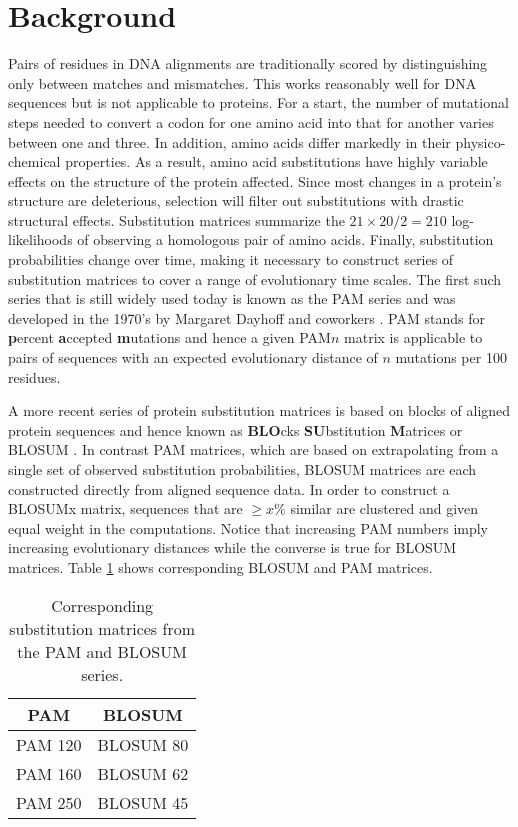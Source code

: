 \section{Background}
Pairs of residues in DNA alignments are traditionally scored by
distinguishing only between matches and mismatches. This works
reasonably well for DNA sequences but is not applicable to
proteins. For a start, the number of mutational steps needed to
convert a codon for one amino acid into that for another varies
between one and three. In addition, amino acids differ markedly in their
physico-chemical properties. As a result, amino acid substitutions
have highly variable effects on the structure of the protein
affected. Since most changes in a protein's structure are deleterious,
selection will filter out 
substitutions with drastic structural effects. Substitution matrices
summarize the $21\times20/2 = 210$
log-likelihoods of observing a homologous pair of amino acids. 
Finally, substitution probabilities change over time,
making it necessary to construct series of substitution
matrices to cover a range of evolutionary time scales. The first such
series that is still widely used today is known as the PAM
series and was developed in the 1970's by Margaret Dayhoff and coworkers
\cite{day78:mod}. PAM stands for \textbf{p}ercent \textbf{a}ccepted
\textbf{m}utations and hence a given PAM$n$
matrix is applicable to pairs of sequences with an expected evolutionary
distance of $n$ mutations per 100 residues.

A more recent series of protein substitution matrices is based on 
blocks of aligned protein sequences and hence known as \textbf{BLO}cks
\textbf{SU}bstitution \textbf{M}atrices or BLOSUM
\cite{hen92:ami}. In contrast PAM matrices, which are based on
extrapolating from a single set of observed substitution
probabilities, BLOSUM matrices are each constructed directly from
aligned sequence data. In order to construct a BLOSUMx matrix,
sequences that are $\ge x\%$ similar are clustered and given equal
weight in the computations. Notice that increasing PAM numbers imply
increasing evolutionary distances while the converse is true for
BLOSUM matrices. Table \ref{tab:pam} shows corresponding BLOSUM and
PAM matrices. 
\begin{table}
\begin{center}
\begin{tabular}{cc}
\hline\hline
PAM & BLOSUM\\
\hline
PAM 120 & BLOSUM 80\\
PAM 160 & BLOSUM 62\\
PAM 250 & BLOSUM 45\\
\hline\hline
\end{tabular}
\end{center}
\caption{Corresponding substitution matrices from the PAM and BLOSUM series.}\label{tab:pam}
\end{table}

